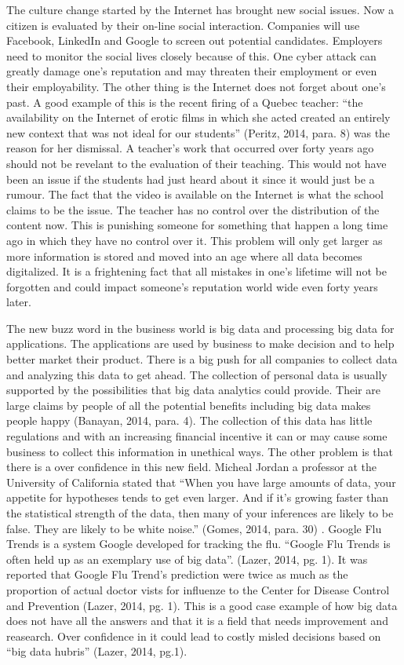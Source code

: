 \documentclass[12pt]{article}
\begin{document}
The culture change started by the Internet has brought new social issues. Now a citizen is evaluated by their on-line social interaction. Companies will use Facebook, LinkedIn and Google to screen out potential candidates. Employers need to monitor the social lives closely because of this. One cyber attack can greatly damage one's reputation and may threaten their employment or even their employability. The other thing is the Internet does not forget about one's past. A good example of this is the recent firing of a Quebec teacher: ``the availability on the Internet of erotic films in which she acted created an entirely new context that was not ideal for our students'' (Peritz, 2014, para. 8) was the reason for her dismissal. A teacher's work that occurred over forty years ago should not be revelant to the evaluation of their teaching. This would not have been an issue if the students had just heard about it since it would just be a rumour. The fact that the video is available on the Internet is what the school claims to be the issue. The teacher has no control over the distribution of the content now. This is punishing someone for something that happen a long time ago in which they have no control over it. This problem will only get larger as more information is stored and moved into an age where all data becomes digitalized. It is a frightening fact that all mistakes in one's lifetime will not be forgotten and could impact someone's reputation world wide even forty years later.

The new buzz word in the business world is big data and processing big data for applications. The applications are used by business to make decision and to help better market their product. There is a big push for all companies to collect data and analyzing this data to get ahead. The collection of personal data is usually supported by the possibilities that big data analytics could provide. Their are large claims by people of all the potential benefits including big data makes people happy (Banayan, 2014, para. 4). The collection of this data has little regulations and with an increasing financial incentive it can or may cause some business to collect this information in unethical ways. The other problem is that there is a over confidence in this new field. Micheal Jordan a professor at the University of California stated that ``When you have large amounts of data, your appetite for hypotheses tends to get even larger. And if it’s growing faster than the statistical strength of the data, then many of your inferences are likely to be false. They are likely to be white noise.'' (Gomes, 2014, para. 30) . Google Flu Trends is a system Google developed for tracking the flu. ``Google Flu Trends is often held up as an exemplary use of big data''. (Lazer, 2014, pg. 1). It was reported that Google Flu Trend's prediction were twice as much as the proportion of actual doctor vists for influenze to the Center for Disease Control and Prevention (Lazer, 2014, pg. 1). This is a good case example of how big data does not have all the answers and that it is a field that needs improvement and reasearch. Over confidence in it could lead to costly misled decisions based on ``big data hubris'' (Lazer, 2014, pg.1).
\end{document}
